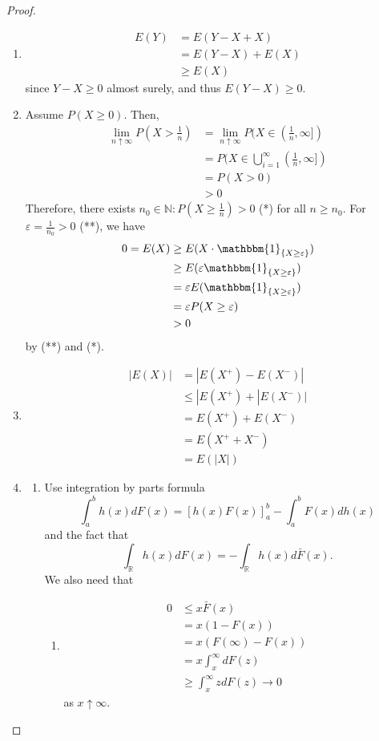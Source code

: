 \documentclass{article}
\newcommand{\R}{\mathbb{R}}
\newcommand{\N}{\mathbb{N}}
\begin{document}
\begin{myprop}{}{}
\begin{proof}
\begin{enumerate}
					\item
					\begin{align*}
						E(Y)&=E(Y-X+X)\\
						&=E(Y-X)+E(X)\\
						&\geq E(X)
					\end{align*}
					since $Y-X\geq0$ almost surely, and thus $E(Y-X)\geq0$.
					
					\item Assume $P(X\geq0)$. Then,
					\begin{align*}
						\lim_{n\uparrow\infty}P(X>\frac{1}{n})&=\lim_{n\uparrow\infty}P(X\in(\frac{1}{n}, \infty])\\
						&=P(X\in\bigcup_{i=1}^{\infty}(\frac{1}{n}, \infty])\\
						&=P(X>0)\\
						&>0
					\end{align*}
					Therefore, there exists $n_0\in\N : P(X\geq\frac{1}{n})>0$ (*) for all $n\geq n_0$. For $\varepsilon=\frac{1}{n_0}>0$ (**), we have
					\begin{align*}
						0=E(X)&\geq E(X\cdot\mathbbm{1}_{\{X\geq\varepsilon\}})\\
						&\geq E(\varepsilon\mathbbm{1}_{\{X\geq\varepsilon\}})\\
						&=\varepsilon E(\mathbbm{1}_{\{X\geq\varepsilon\}})\\
						&=\varepsilon P(X\geq\varepsilon)\\
						&>0
					\end{align*}
					by (**) and (*).
					
					\item
					\begin{align*}
						|E(X)|&=|E(X^+)-E(X^-)|\\
						&\leq|E(X^+)+|E(X^-)|\\
						&=E(X^+)+E(X^-)\\
						&=E(X^++X^-)\\
						&=E(|X|)
					\end{align*}
					
					\item
					\begin{enumerate}[label=(\roman*)]
						\item Use integration by parts formula $$\int_a^bh(x)dF(x)=[h(x)F(x)]_a^b-\int_a^bF(x)dh(x)$$ and the fact that $$\int_{\R}h(x)dF(x)=-\int_{\R}h(x)d\bar{F}(x).$$
						We also need that
						\begin{enumerate}[label=(\alph*)]
							\item
							\begin{align*}
								0&\leq x\bar{F}(x)\\
								&=x(1-F(x))\\
								&=x(F(\infty)-F(x))\\
								&=x\int_{x}^{\infty}dF(z)\\
								&\geq\int_{x}^{\infty}zdF(z)\to0
							\end{align*}
							as $x\uparrow\infty$.
							

\end{enumerate}
\end{enumerate}
\end{enumerate}
\end{proof}
\end{myprop}
\end{document}
